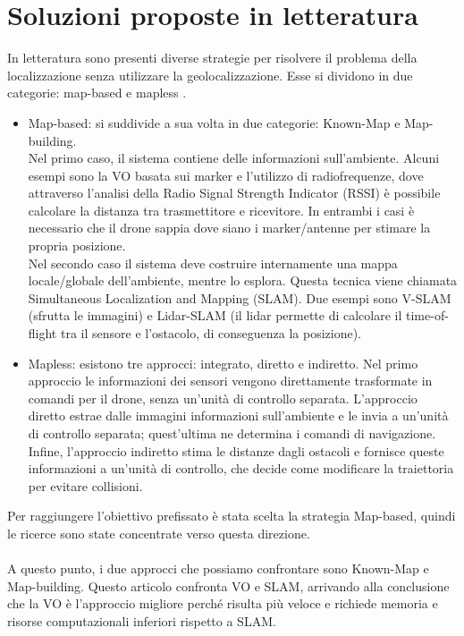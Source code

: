 \section{Soluzioni proposte in letteratura}
\label{sec:problema:letteratura}
In letteratura sono presenti diverse strategie per risolvere il problema della localizzazione senza utilizzare la geolocalizzazione. Esse si dividono in due categorie: map-based e mapless \cite{CHANG2023104533}.
\begin{itemize}
	\item Map-based: si suddivide a sua volta in due categorie: Known-Map e Map-building.\\
	Nel primo caso, il sistema contiene delle informazioni sull'ambiente. Alcuni esempi sono la VO basata sui marker e l'utilizzo di radiofrequenze, dove attraverso l'analisi della Radio Signal Strength Indicator (RSSI) è possibile calcolare la distanza tra trasmettitore e ricevitore. In entrambi i casi è necessario che il drone sappia dove siano i marker/antenne per stimare la propria posizione. \\
	Nel secondo caso il sistema deve costruire internamente una mappa locale/globale dell'ambiente, mentre lo esplora. Questa tecnica viene chiamata Simultaneous Localization and Mapping (SLAM). Due esempi sono V-SLAM (sfrutta le immagini) e Lidar-SLAM (il lidar permette di calcolare il time-of-flight tra il sensore e l'ostacolo, di conseguenza la posizione).
	\item Mapless: esistono tre approcci: integrato, diretto e indiretto. Nel primo approccio le informazioni dei sensori vengono direttamente trasformate in comandi per il drone, senza un'unità di controllo separata. L'approccio diretto estrae dalle immagini informazioni sull'ambiente e le invia a un'unità di controllo separata; quest'ultima ne determina i comandi di navigazione. Infine, l'approccio indiretto stima le distanze dagli ostacoli e fornisce queste informazioni a un'unità di controllo, che decide come modificare la traiettoria per evitare collisioni.
\end{itemize}
Per raggiungere l'obiettivo prefissato è stata scelta la strategia Map-based, quindi le ricerce sono state concentrate verso questa direzione.
\\ \\
A questo punto, i due approcci che possiamo confrontare sono Known-Map e Map-building. Questo articolo \cite{7955787} confronta VO e SLAM, arrivando alla conclusione che la VO è l'approccio migliore perché risulta più veloce e richiede memoria e risorse computazionali inferiori rispetto a SLAM.
